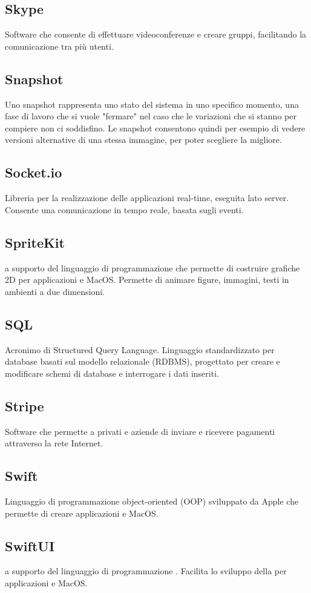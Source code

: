 \subsection*{Skype}
Software che consente di effettuare videoconferenze e creare gruppi, facilitando la comunicazione tra più utenti. 

\subsection*{Snapshot}
Uno snapshot rappresenta uno stato del sistema in uno specifico momento, una fase di lavoro che si vuole "fermare" nel caso che le variazioni che si stanno per compiere non ci soddisfino. Le snapshot consentono quindi per esempio di vedere versioni alternative di una stessa immagine, per poter scegliere la migliore.

\subsection*{Socket.io}
Libreria  per la realizzazione delle applicazioni real-time, eseguita lato server. Consente una comunicazione in tempo reale, basata sugli eventi.

\subsection*{SpriteKit}
 a supporto del linguaggio di programmazione  che permette di costruire grafiche 2D per applicazioni  e MacOS. Permette di animare figure, immagini, testi in ambienti a due dimensioni.

\subsection*{SQL}
Acronimo di Structured Query Language. Linguaggio standardizzato per database basati sul modello relazionale (RDBMS), progettato per creare e modificare schemi di database e interrogare i dati inseriti.

\subsection*{Stripe}
Software che permette a privati e aziende di inviare e ricevere pagamenti attraverso la rete Internet.

\subsection*{Swift}
Linguaggio di programmazione object-oriented (OOP) sviluppato da Apple che permette di creare applicazioni  e MacOS.  

\subsection*{SwiftUI}
 a supporto del linguaggio di programmazione . Facilita lo sviluppo della  per applicazioni  e MacOS.